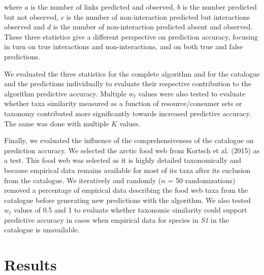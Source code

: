 \documentclass[letterpaper]{article}
\begin{document}
where $a$ is the number of links predicted and observed, $b$ is the number predicted but not observed, $c$ is the number of non-interaction predicted but interactions observed and $d$ is the number of non-interaction predicted absent and observed. These three statistics give a different perspective on prediction accuracy, focusing in turn on true interactions and non-interactions, and on both true and false predictions.

We evaluated the three statistics for the complete algorithm and for the catalogue and the predictions individually to evaluate their respective contribution to the algorithm predictive accuracy. Multiple $w_t$ values were also tested to evaluate whether taxa similarity measured as a function of resource/consumer sets or taxonomy contributed more significantly towards increased predictive accuracy. The same was done with multiple $K$ values.

Finally, we evaluated the influence of the comprehensiveness of the catalogue on prediction accuracy. We selected the arctic food web from Kortsch et al. (2015) as a test. This food web was selected as it is highly detailed taxonomically and because empirical data remains available for most of its taxa after its exclusion from the catalogue.
We iteratively and randomly ($n$ = 50 randomizations) removed a percentage of empirical data describing the food web taxa from the catalogue before generating new predictions with the algorithm. We also tested $w_t$ values of 0.5 and 1 to evaluate whether taxonomic similarity could support predictive accuracy in cases when empirical data for species in \textit{S1} in the catalogue is unavailable.


\section{Results}
\end{document}
